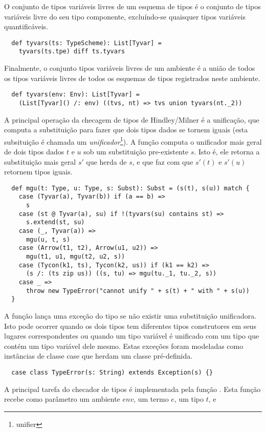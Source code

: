 O conjunto de tipos variáveis livres de um esquema de tipos é o conjunto de tipos variáveis livre do seu tipo componente,
excluíndo-se quaisquer tipos variáveis quantificáveis.
\begin{lstlisting}
  def tyvars(ts: TypeScheme): List[Tyvar] = 
    tyvars(ts.tpe) diff ts.tyvars
\end{lstlisting}
Finalmente, o conjunto  tipos variáveis livres de um ambiente é a união
de todos os  tipos variáveis livres de todos os esquemas de tipos registrados neste ambiente.
\begin{lstlisting}
  def tyvars(env: Env): List[Tyvar] =
    (List[Tyvar]() /: env) ((tvs, nt) => tvs union tyvars(nt._2))
\end{lstlisting}
A principal operação da checagem de tipos de Hindley/Milner é a unificação,
que computa a substituição para fazer que dois tipos dados se tornem iguais
 (esta subsituição é chamada um {\em unificador}\footnote{unifier}).  A função  computa
o unificador mais geral de dois tipos dados $t$ e $u$ sob um substituição pre-existente $s$.  
Isto é, ele retorna a substituição mais geral $s'$ que herda de $s$, e que faz com que $s'(t)$ e
$s'(u)$ retornem tipos iguais. 
\begin{lstlisting}
  def mgu(t: Type, u: Type, s: Subst): Subst = (s(t), s(u)) match {
    case (Tyvar(a), Tyvar(b)) if (a == b) =>
      s
    case (st @ Tyvar(a), su) if !(tyvars(su) contains st) =>
      s.extend(st, su)
    case (_, Tyvar(a)) =>
      mgu(u, t, s)
    case (Arrow(t1, t2), Arrow(u1, u2)) =>
      mgu(t1, u1, mgu(t2, u2, s))
    case (Tycon(k1, ts), Tycon(k2, us)) if (k1 == k2) =>
      (s /: (ts zip us)) ((s, tu) => mgu(tu._1, tu._2, s))
    case _ => 
      throw new TypeError("cannot unify " + s(t) + " with " + s(u))
  }
\end{lstlisting}
A função  lança uma exceção do tipo  se não existir uma
substituição unificadora. Isto pode ocorrer quando os dois tipos tem diferentes
tipos construtores em seus lugares correspondentes ou quando um tipo variável é 
unificado com um tipo que contém um tipo variável dele mesmo.
Estas exceções foram modeladas como instâncias de classe case que herdam um classe
  pré-definida.
\begin{lstlisting}
  case class TypeError(s: String) extends Exception(s) {}
\end{lstlisting}
A principal tarefa do checador de tipos é implementada pela função
. Esta função recebe como parâmetro um ambiente $env$,  um termo $e$, um tipo $t$, e

